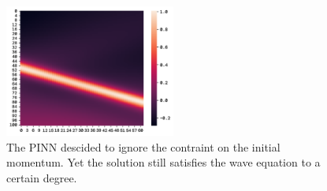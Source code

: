\documentclass[twoside,11pt]{report}
\begin{document}
    \begin{figure}[!ht]
            \begin{center}
                \includegraphics[width=0.5\textwidth]{../runsAndFigures/wave_tf_pinn_velocity.png}
            \end{center}
            \caption
            {
                The PINN descided to ignore the contraint on the initial momentum. Yet the solution still satisfies the
                wave equation to a certain degree.
            }\label{fig:wave_tf_dnn}
    \end{figure}
\end{document}
